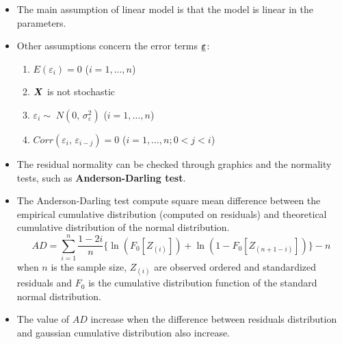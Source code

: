 
\begin{frame}
  \begin{itemize}
    \vspace{0.5cm}
    \item The main assumption of linear model is that the model is linear in the parameters.
    \vspace{0.5cm}
    \item Other assumptions concern the error terms $ \boldsymbol{\underline{\varepsilon}} $:
      \begin{enumerate}
        \vspace{0.25cm}
        \item $ E(\varepsilon_{i}) = 0 $ \hspace{1.7cm} ($ i = 1, \dots, n $)
        \vspace{0.25cm}
        \item $ \boldsymbol{X} $ is not stochastic
        \vspace{0.25cm}
        \item $ \varepsilon_i \sim\; N(0,\,\sigma^2_\varepsilon) $ \hspace{1cm} ($ i = 1, \dots, n $)
        \vspace{0.25cm}
        \item $ Corr(\varepsilon_{i},\,\varepsilon_{i-j}) = 0 $ \hspace{0.4cm} ($ i = 1, \dots, n; 0 < j < i $)
      \end{enumerate}
  \end{itemize}
\end{frame}

\begin{frame}
  \begin{itemize}
    \vspace{0.25cm}
    \item The residual normality can be checked through graphics and the normality tests, such as \textbf{Anderson-Darling test}.
    \vspace{0.25cm}
    \item The Anderson-Darling test compute square mean difference between the empirical cumulative distribution (computed on residuals) and theoretical cumulative distribution of the normal distribution. 
      $$ AD = \sum_{i=1}^n {\frac{1-2i}{n}}\{\ln(F_0[Z_{(i)}])+\ln(1-F_0[Z_{(n+1-i)}])\} - n $$
      when $ n $ is the sample size, $ Z_{(i)} $ are observed ordered and standardized residuals and $ F_0 $ is the cumulative distribution function of the standard normal distribution.
    \vspace{0.25cm}
    \item The value of $ AD $ increase when the difference between residuals distribution and gaussian cumulative distribution also increase.
  \end{itemize}
\end{frame}



